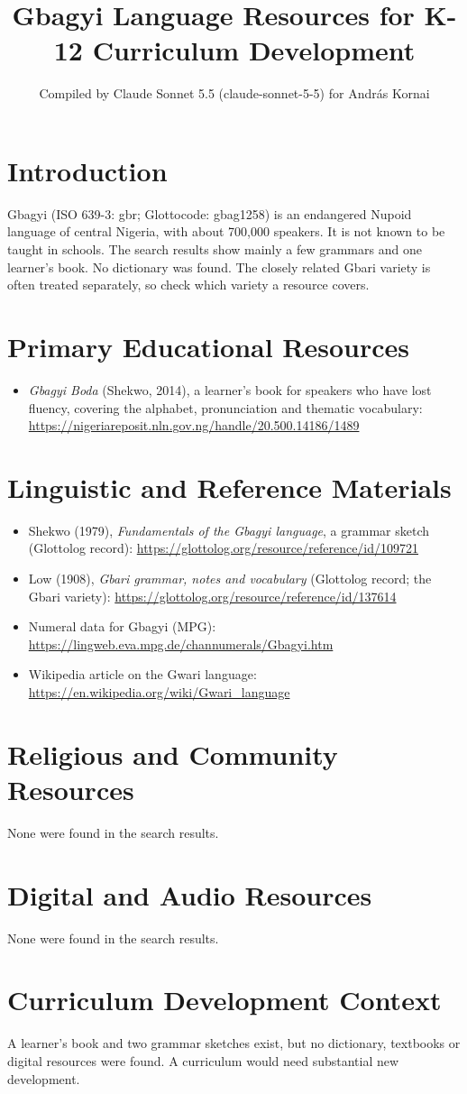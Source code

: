 \documentclass[12pt]{article}
\title{Gbagyi Language Resources for K-12 Curriculum Development}
\author{Compiled by Claude Sonnet 5.5 (claude-sonnet-5-5) for Andr\'as Kornai}
\date{}
\begin{document}
\maketitle

\section{Introduction}
Gbagyi (ISO 639-3: gbr; Glottocode: gbag1258) is an endangered Nupoid language of central Nigeria, with about 700,000 speakers. It is not known to be taught in schools. The search results show mainly a few grammars and one learner's book. No dictionary was found. The closely related Gbari variety is often treated separately, so check which variety a resource covers.

\section{Primary Educational Resources}
\begin{itemize}
\item \emph{Gbagyi Boda} (Shekwo, 2014), a learner's book for speakers who have lost fluency, covering the alphabet, pronunciation and thematic vocabulary: \url{https://nigeriareposit.nln.gov.ng/handle/20.500.14186/1489}
\end{itemize}

\section{Linguistic and Reference Materials}
\begin{itemize}
\item Shekwo (1979), \emph{Fundamentals of the Gbagyi language}, a grammar sketch (Glottolog record): \url{https://glottolog.org/resource/reference/id/109721}
\item Low (1908), \emph{Gbari grammar, notes and vocabulary} (Glottolog record; the Gbari variety): \url{https://glottolog.org/resource/reference/id/137614}
\item Numeral data for Gbagyi (MPG): \url{https://lingweb.eva.mpg.de/channumerals/Gbagyi.htm}
\item Wikipedia article on the Gwari language: \url{https://en.wikipedia.org/wiki/Gwari_language}
\end{itemize}

\section{Religious and Community Resources}
None were found in the search results.

\section{Digital and Audio Resources}
None were found in the search results.

\section{Curriculum Development Context}
A learner's book and two grammar sketches exist, but no dictionary, textbooks or digital resources were found. A curriculum would need substantial new development.
\end{document}
